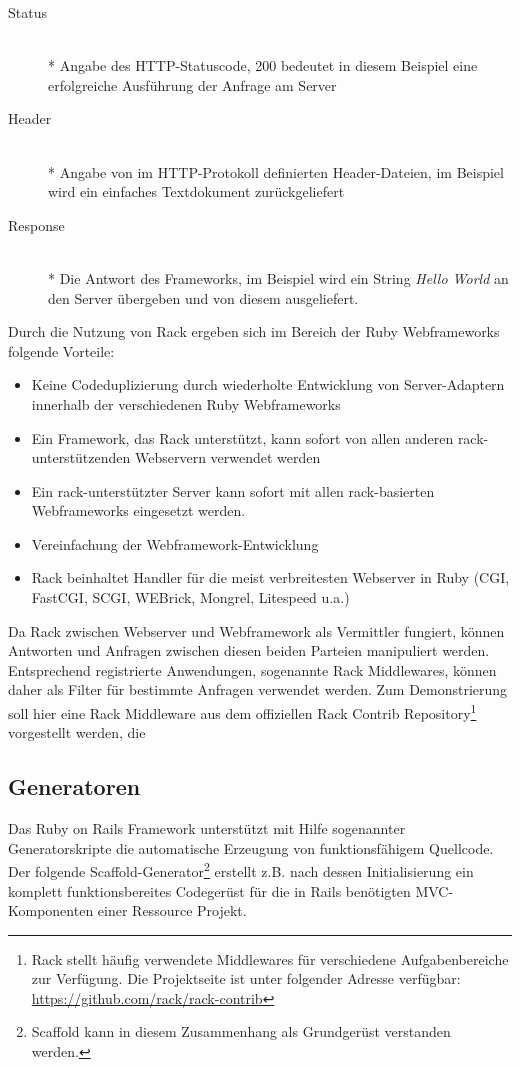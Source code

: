 \begin{description}
\item[Status]\mbox{~}\\*
Angabe des HTTP-Statuscode, 200 bedeutet in diesem Beispiel eine erfolgreiche Ausführung der Anfrage am Server
\item[Header]\mbox{~}\\*
Angabe von im HTTP-Protokoll definierten Header-Dateien,  im Beispiel wird ein einfaches Textdokument zurückgeliefert
\item[Response]\mbox{~}\\*
Die Antwort des Frameworks, im Beispiel wird ein String \emph{Hello World} an den Server übergeben und von diesem ausgeliefert.
\end{description}



Durch die Nutzung von Rack ergeben sich im Bereich der Ruby Webframeworks folgende Vorteile:

\begin{itemize}
\item
Keine Codeduplizierung durch wiederholte Entwicklung von Server-Adaptern innerhalb der verschiedenen Ruby Webframeworks
\item
Ein Framework, das Rack unterstützt, kann sofort von allen anderen rack-unterstützenden Webservern verwendet werden
\item
Ein rack-unterstützter Server kann sofort mit allen rack-basierten Webframeworks eingesetzt werden.
\item
Vereinfachung der Webframework-Entwicklung
\item
Rack beinhaltet Handler für die meist verbreitesten Webserver in Ruby (CGI, FastCGI, SCGI, WEBrick, Mongrel, Litespeed u.a.)
\end{itemize}


Da Rack zwischen Webserver und Webframework als Vermittler fungiert, können Antworten und Anfragen zwischen diesen beiden Parteien manipuliert werden. Entsprechend registrierte Anwendungen, sogenannte Rack Middlewares, können daher als Filter für bestimmte Anfragen verwendet werden.
Zum Demonstrierung soll hier eine Rack Middleware aus dem offiziellen Rack Contrib Repository\footnote{Rack stellt häufig verwendete Middlewares für verschiedene Aufgabenbereiche zur Verfügung. Die Projektseite ist unter folgender Adresse verfügbar: \href{https://github.com/rack/rack-contrib}{https://github.com/rack/rack-contrib}} vorgestellt werden, die

\subsection{Generatoren}
Das Ruby on Rails Framework unterstützt mit Hilfe sogenannter Generatorskripte die automatische Erzeugung von funktionsfähigem Quellcode. Der folgende Scaffold-Generator\footnote{Scaffold kann in diesem Zusammenhang als Grundgerüst verstanden werden.} erstellt z.B. nach dessen Initialisierung ein komplett funktionsbereites Codegerüst für die in Rails benötigten MVC-Komponenten einer Ressource Projekt.

